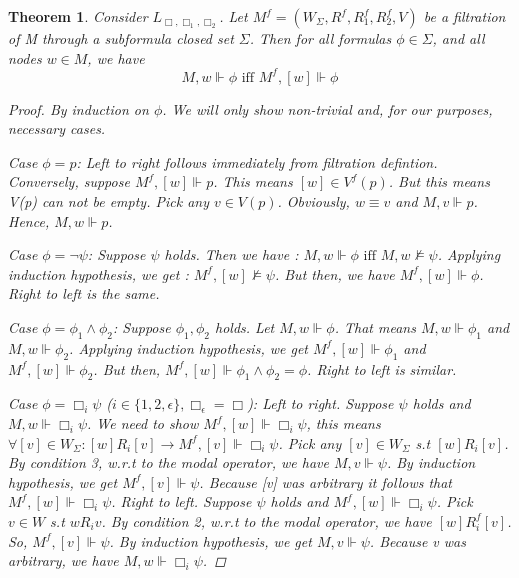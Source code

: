 \documentclass[12pt, a4paper]{scrartcl}
\newtheorem{theorem}[definition]{Theorem}
\begin{document}
\begin{theorem}
    Consider $L_{\Box, \Box_1, \Box_2}$. Let $M^f =(W_\Sigma, R^f, R^f_1, R^f_2, V)$ be a filtration of M through a subformula closed set $\Sigma$.
    Then for all formulas $\phi \in \Sigma$, and all nodes $w \in M$, we have $$M,w \Vdash \phi \mbox{ iff } M^f,[w] \Vdash \phi$$
    
    \begin{proof}
        By induction on $\phi$. We will only show non-trivial and, for our purposes, necessary cases. \newline
        
        Case $\phi = p$: Left to right follows immediately from filtration defintion. Conversely, suppose
        $M^f, [w] \Vdash p$. This means $ [w] \in V^f(p)$. But this means V(p) can not be empty. Pick any $v\in V(p)$. Obviously, $w\equiv v$ and
        $M,v\Vdash p$. Hence, $M,w \Vdash p$. \newline
        
        Case $\phi = \neg \psi$: Suppose $\psi$ holds. Then we have : $M,w \Vdash \phi \mbox{ iff } M,w \nvDash \psi$. Applying 
        induction hypothesis, we get : $M^f, [w] \nvDash \psi$. But then, we have $M^f, [w] \Vdash \phi$. Right to left is the same. \newline
        
        Case $\phi = \phi_1 \land \phi_2$: Suppose $\phi_1, \phi_2$ holds. Let $M,w \Vdash \phi$. That means $M,w \Vdash \phi_1$ and $M,w \Vdash \phi_2$. Applying
        induction hypothesis, we get $M^f,[w] \Vdash \phi_1$ and $M^f,[w] \Vdash \phi_2$. But then, $M^f,[w] \Vdash \phi_1 \land \phi_2 = \phi$. Right to left is similar. \newline
        
        Case $\phi = \Box_i\psi$ ($i \in \{1,2,\epsilon\}, \Box_\epsilon = \Box$): Left to right. Suppose $\psi$ holds and  $M,w \Vdash \Box_i \psi$. 
        We need to show $M^f,[w] \Vdash \Box_i \psi$, this means $\forall [v] \in W_\Sigma : [w]R_i[v] \rightarrow M^f,[v] \Vdash \Box_i \psi$. Pick any $[v] \in W_\Sigma$ s.t 
        $[w]R_i[v]$. By condition 3, w.r.t to the modal operator, we have $M,v \Vdash \psi$. By induction hypothesis, we get $M^f,[v] \Vdash \psi$. Because [v] was arbitrary it follows that $M^f,[w] \Vdash \Box_i \psi$. \newline \newline
        Right to left. Suppose $\psi$ holds and $M^f,[w] \Vdash \Box_i \psi$. Pick $v \in W$ s.t $wR_iv$. By condition 2, w.r.t to the modal operator, we have
        $[w]R^f_i[v]$. So, $M^f, [v] \Vdash \psi$. By induction hypothesis, we get $M,v \Vdash \psi$. Because v was arbitrary, we have $M,w \Vdash \Box_i \psi$.
    
    \end{proof}     
\end{theorem}
\end{document}
